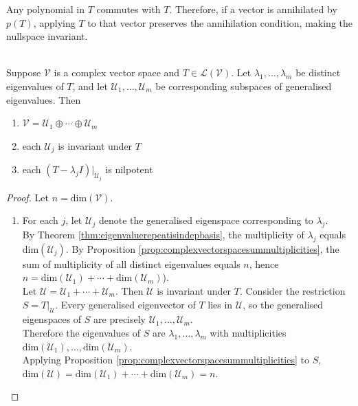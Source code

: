 Any polynomial in $T$ commutes with $T$. Therefore, if a vector is annihilated by $p(T)$, applying $T$ to that vector preserves the annihilation condition, making the nullspace invariant.

\begin{theorem} \label{thm:majorstructurethm} \\
Suppose $\mathcal{V}$ is a complex vector space and $T \in \mathcal{L}(\mathcal{V})$. Let $\lambda_1, \ldots, \lambda_m$ be distinct eigenvalues of $T$, and let $\mathcal{U}_1, \ldots, \mathcal{U}_m$ be corresponding subspaces of generalised eigenvalues. Then
\begin{enumerate}[label=\roman*.]
\setlength{\itemsep}{0pt}
\item $\mathcal{V} = \mathcal{U}_1 \oplus \cdots \oplus \mathcal{U}_m$
\item each $\mathcal{U}_j$ is invariant under $T$
\item each $(T - \lambda_j I)|_{\mathcal{U}_j}$ is nilpotent
\end{enumerate}
\begin{proof} Let $n = \text{dim}(\mathcal{V})$.
\begin{enumerate}[label=\roman*.]
\setlength{\itemsep}{0pt}
\item[$(i)$] For each $j$, let $\mathcal{U}_j$ denote the generalised eigenspace corresponding to $\lambda_j$.\\
By Theorem \ref{thm:eigenvaluerepeatisindepbasis}, the multiplicity of $\lambda_j$ equals $\text{dim}(\mathcal{U}_j)$. By Proposition \ref{prop:complexvectorspacesummultiplicities}, the sum of multiplicity of all distinct eigenvalues equals $n$, hence $n = \text{dim}(\mathcal{U}_1) + \cdots + \text{dim}(\mathcal{U}_m)$).\\
Let $\mathcal{U} = \mathcal{U}_1 + \cdots + \mathcal{U}_m$. Then $\mathcal{U}$ is invariant under $T$. Consider the restriction $S = T|_{\mathcal{U}}$. Every generalised eigenvector of $T$ lies in $\mathcal{U}$, so the generalised eigenspaces of $S$ are precisely $\mathcal{U}_1, \ldots, \mathcal{U}_m$.\\
Therefore the eigenvalues of $S$ are $\lambda_1, \ldots, \lambda_m$ with multiplicities $\text{dim}(\mathcal{U}_1), \ldots, \text{dim}(\mathcal{U}_m)$.\\
Applying Proposition \ref{prop:complexvectorspacesummultiplicities} to $S$, $\text{dim}(\mathcal{U}) = \text{dim}(\mathcal{U}_1) + \cdots + \text{dim}(\mathcal{U}_m) = n$.\\

\end{enumerate}
\end{proof}
\end{theorem}
